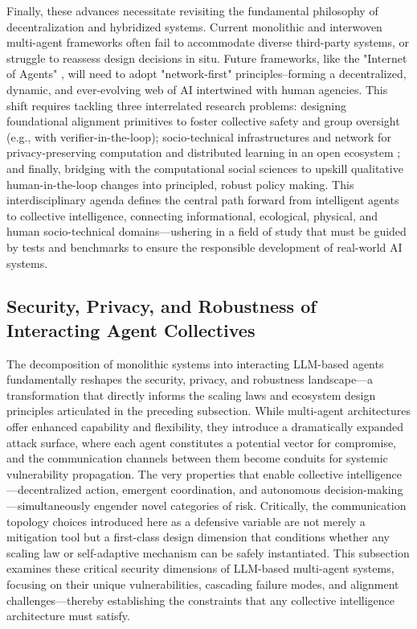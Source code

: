 \documentclass[11pt,a4paper]{article}
\begin{document}
Finally, these advances necessitate revisiting the fundamental philosophy of decentralization and hybridized systems. Current monolithic and interwoven multi-agent frameworks often fail to accommodate diverse third-party systems, or struggle to reassess design decisions in situ. Future frameworks, like the "Internet of Agents" \cite{arxiv:2407.07061v2}, will need to adopt "network-first" principles--forming a decentralized, dynamic, and ever-evolving web of AI intertwined with human agencies. This shift requires tackling three interrelated research problems: designing foundational alignment primitives to foster collective safety and group oversight (e.g., with verifier-in-the-loop); socio-technical infrastructures and network for privacy-preserving computation and distributed learning in an open ecosystem \cite{arxiv:2407.19354v1}; and finally, bridging with the computational social sciences to upskill qualitative human-in-the-loop changes into principled, robust policy making. This interdisciplinary agenda defines the central path forward from intelligent agents to collective intelligence, connecting informational, ecological, physical, and human socio-technical domains---ushering in a field of study that must be guided by tests and benchmarks to ensure the responsible development of real-world AI systems.


\subsection{Security, Privacy, and Robustness of Interacting Agent Collectives}


The decomposition of monolithic systems into interacting LLM-based agents fundamentally reshapes the security, privacy, and robustness landscape---a transformation that directly informs the scaling laws and ecosystem design principles articulated in the preceding subsection. While multi-agent architectures offer enhanced capability and flexibility, they introduce a dramatically expanded attack surface, where each agent constitutes a potential vector for compromise, and the communication channels between them become conduits for systemic vulnerability propagation. The very properties that enable collective intelligence---decentralized action, emergent coordination, and autonomous decision-making---simultaneously engender novel categories of risk. Critically, the communication topology choices introduced here as a defensive variable are not merely a mitigation tool but a first-class design dimension that conditions whether any scaling law or self-adaptive mechanism can be safely instantiated. This subsection examines these critical security dimensions of LLM-based multi-agent systems, focusing on their unique vulnerabilities, cascading failure modes, and alignment challenges---thereby establishing the constraints that any collective intelligence architecture must satisfy.
\end{document}
